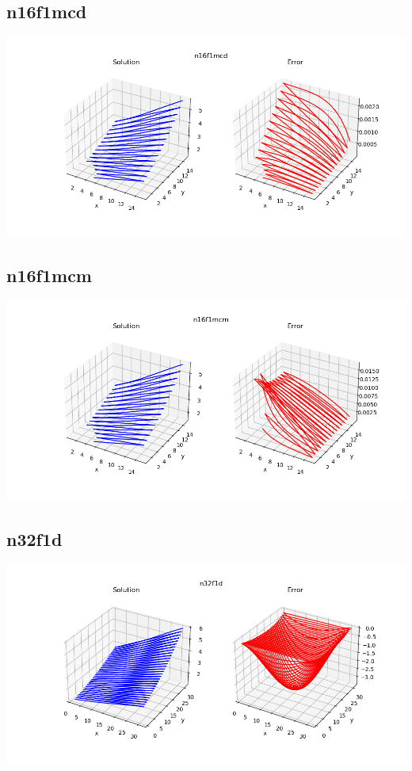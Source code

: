\subsection*{n16f1mcd}
\includegraphics[scale=0.6]{../../image/n16f1mcd.png}
\subsection*{n16f1mcm}
\includegraphics[scale=0.6]{../../image/n16f1mcm.png}
\subsection*{n32f1d}
\includegraphics[scale=0.6]{../../image/n32f1d.png}
